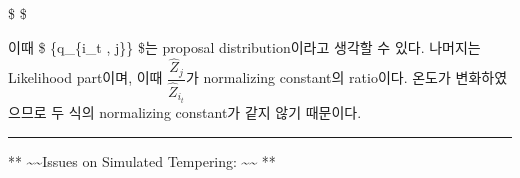 \documentclass[
]{book}
\begin{document}
\$
\min {}\$

이때 \$ \{q\_\{i\_t , j\}\} \$는 proposal distribution이라고 생각할 수 있다. 나머지는 Likelihood part이며, 이때 \(\dfrac {\hat Z_j} {\hat Z_{i_t}}\)가 normalizing constant의 ratio이다. 온도가 변화하였으므로 두 식의 normalizing constant가 같지 않기 때문이다.

\begin{center}\rule{0.5\linewidth}{0.5pt}\end{center}

** \textasciitilde\textasciitilde Issues on Simulated Tempering: \textasciitilde\textasciitilde{} **
\end{document}
